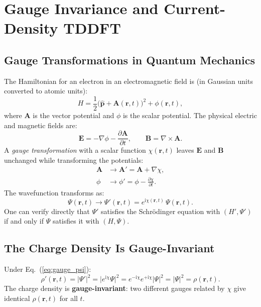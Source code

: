 \documentclass[12pt,letterpaper]{article}
\newcommand{\ii}{\mathrm{i}}
\theoremstyle{definition}
\begin{document}
\section{Gauge Invariance and Current-Density TDDFT}
\label{sec:gauge}

\subsection{Gauge Transformations in Quantum Mechanics}

The Hamiltonian for an electron in an electromagnetic field is
(in Gaussian units converted to atomic units):
\begin{equation}
  H = \frac{1}{2}\bigl(\hat{\bm{p}} + \bm{A}(\bm{r},t)\bigr)^2
  + \phi(\bm{r},t),
  \label{eq:H_em}
\end{equation}
where $\bm{A}$ is the vector potential and $\phi$ is the scalar potential.
The physical electric and magnetic fields are:
\begin{equation}
  \bm{E} = -\nabla\phi - \frac{\partial\bm{A}}{\partial t},
  \qquad
  \bm{B} = \nabla\times\bm{A}.
  \label{eq:EB}
\end{equation}
A \emph{gauge transformation} with a scalar function $\chi(\bm{r},t)$ leaves
$\bm{E}$ and $\bm{B}$ unchanged while transforming the potentials:
\begin{align}
  \bm{A} &\to \bm{A}' = \bm{A} + \nabla\chi, \label{eq:gauge_A}\\
  \phi &\to \phi' = \phi - \frac{\partial\chi}{\partial t}. \label{eq:gauge_phi}
\end{align}
The wavefunction transforms as:
\begin{equation}
  \Psi(\bm{r},t) \to \Psi'(\bm{r},t) = e^{\ii\chi(\bm{r},t)}\,\Psi(\bm{r},t).
  \label{eq:gauge_psi}
\end{equation}
One can verify directly that $\Psi'$ satisfies the Schr\"{o}dinger equation with
$(H', \Psi')$ if and only if $\Psi$ satisfies it with $(H, \Psi)$.

\subsection{The Charge Density Is Gauge-Invariant}

\begin{derivbox}
Under Eq.~(\ref{eq:gauge_psi}):
\begin{equation}
  \rho'(\bm{r},t) = |\Psi'|^2
  = \bigl|e^{\ii\chi}\Psi\bigr|^2
  = e^{-\ii\chi}e^{+\ii\chi}|\Psi|^2
  = |\Psi|^2 = \rho(\bm{r},t).
  \label{eq:rho_invariant}
\end{equation}
The charge density is \textbf{gauge-invariant}: two different gauges
related by $\chi$ give identical $\rho(\bm{r},t)$ for all $t$.
\end{derivbox}
\end{document}
